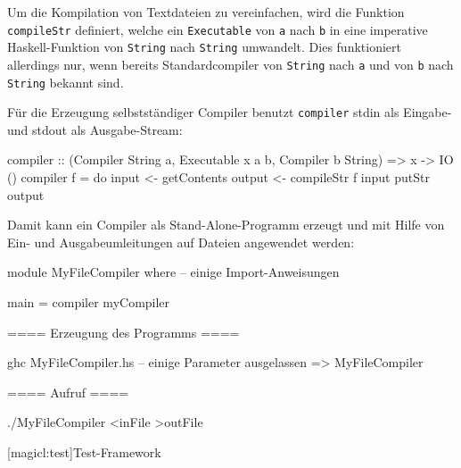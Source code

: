 \documentclass[11pt, a4paper, bibgerm]{scrbook}
\newcommand\icode[1]{\lstinline?#1?}
\newcommand\lsection{}
\begin{document}
Um die Kompilation von Textdateien zu vereinfachen, wird die Funktion
\icode{compileStr} definiert, welche ein \icode{Executable} von
\icode{a} nach \icode{b} in eine imperative Haskell-Funktion von
\icode{String} nach \icode{String} umwandelt. Dies funktioniert
allerdings nur, wenn bereits Standardcompiler von \icode{String} nach
\icode{a} und von \icode{b} nach \icode{String} bekannt sind.
Für die Erzeugung selbstständiger Compiler benutzt \icode{compiler}
stdin als Eingabe- und stdout als Ausgabe-Stream:
\begin{code}
compiler :: (Compiler String a, Executable x a b, Compiler b String) => x -> IO ()
compiler f = do
  input <- getContents
  output <- compileStr f input
  putStr output  
\end{code}
Damit kann ein Compiler als Stand-Alone-Programm erzeugt und mit Hilfe
von Ein- und Ausgabeumleitungen auf Dateien angewendet werden:
\begin{code}
module MyFileCompiler where
-- einige Import-Anweisungen

main = compiler myCompiler

==== Erzeugung des Programms ====

ghc MyFileCompiler.hs  -- einige Parameter ausgelassen
=> MyFileCompiler

==== Aufruf ====

./MyFileCompiler <inFile >outFile
\end{code}

\lsection[magicl:test]{Test-Framework}
\end{document}
